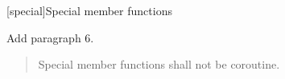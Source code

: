 
\setcounter{chapter}{11}
[special]{Special member functions}

Add paragraph 6.

\begin{quote}
	\setcounter{Paras}{5}
	\pnum
	Special member functions shall not be coroutine.
\end{quote}
